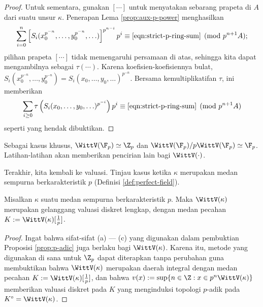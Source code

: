 \begin{proof}
	Untuk sementara, gunakan $[\cdots]$ untuk menyatakan sebarang prapeta di $A$ dari suatu unsur $\kappa$. Penerapan Lema \ref{prop:aux-p-power} menghasilkan
	\[ \sum_{i=0}^n \left[ S_i(x_0^{p^{-n}}, \ldots, y_0^{p^{-n}}, \ldots) \right]^{p^{n-i}} p^i \equiv \eqref{eqn:strict-p-ring-sum} \pmod{p^{n+1}A}; \]
	pilihan prapeta $[\cdots]$ tidak memengaruhi persamaan di atas, sehingga kita dapat mengambilnya sebagai $\tau(\cdots)$. Karena koefisien-koefisiennya bulat, $S_i(x_0^{p^{-n}}, \ldots, y_0^{p^{-n}}) = S_i(x_0, \ldots, y_0, \ldots)^{p^{-n}}$. Bersama kemultiplikatifan $\tau$, ini memberikan
	\[ \sum_{i \geq 0} \tau\left( S_i(x_0, \ldots, y_0, \ldots)^{p^{-i}} \right) p^i \equiv \eqref{eqn:strict-p-ring-sum} \pmod{p^{n+1}A} \]
seperti yang hendak dibuktikan.
\end{proof}
Sebagai kasus khusus, $\WittV(\F_p) \simeq \Z_p$ dan $\WittV(\F_p)/p\WittV(\F_p) \simeq \F_p$. Latihan-latihan akan memberikan pencirian lain bagi $\WittV(\cdot)$.

Terakhir, kita kembali ke valuasi. Tinjau kasus ketika $\kappa$ merupakan medan sempurna berkarakteristik $p$ (Definisi \ref{def:perfect-field}).
\begin{proposition}
	Misalkan $\kappa$ suatu medan sempurna berkarakteristik $p$. Maka $\WittV(\kappa)$ merupakan gelanggang valuasi diskret lengkap, dengan medan pecahan $K := \WittV(\kappa)[\frac{1}{p}]$.
\end{proposition}
\begin{proof}
	Ingat bahwa sifat-sifat (a) --- (c) yang digunakan dalam pembuktian Proposisi \ref{prop:p-adic} juga berlaku bagi $\WittV(\kappa)$. Karena itu, metode yang digunakan di sana untuk $\Z_p$ dapat diterapkan tanpa perubahan guna membuktikan bahwa $\WittV(\kappa)$ merupakan daerah integral dengan medan pecahan $K := \WittV(\kappa)[\frac{1}{p}]$, dan bahwa $v(x) := \sup\{ n \in \Z : x \in p^n \WittV(\kappa) \}$ memberikan valuasi diskret pada $K$ yang menginduksi topologi $p$-adik pada $K^\circ = \WittV(\kappa)$.
\end{proof}

